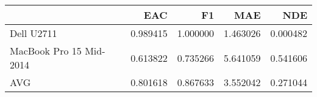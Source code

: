 \begin{tabular}{lrrrr}
\toprule
{} &       EAC &        F1 &       MAE &       NDE \\
\midrule
Dell U2711              &  0.989415 &  1.000000 &  1.463026 &  0.000482 \\
MacBook Pro 15 Mid-2014 &  0.613822 &  0.735266 &  5.641059 &  0.541606 \\
AVG                     &  0.801618 &  0.867633 &  3.552042 &  0.271044 \\
\bottomrule
\end{tabular}
